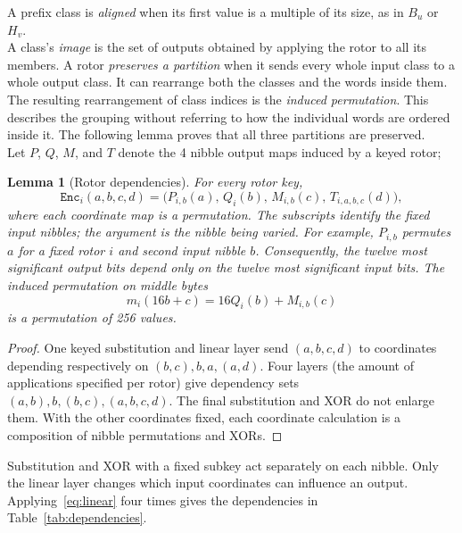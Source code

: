 \documentclass[11pt]{article}
\newtheorem{lemma}[theorem]{Lemma}
\begin{document}
A prefix class is \emph{aligned}
when its first value is a multiple of its size, as in \(B_u\) or \(H_v\).\\

A class's \emph{image} is the set of outputs obtained by applying
the rotor to all its members. A rotor \emph{preserves a partition} when it sends every whole
input class to a whole output class. It can rearrange both the classes
and the words inside them. The resulting rearrangement of class
indices is the \emph{induced permutation}. This describes the grouping without referring to how the individual words are ordered inside it.
The following lemma proves that all
three partitions are preserved.\\

Let \(P\), \(Q\), \(M\), and \(T\) denote the 4 nibble output maps induced by a keyed rotor;

\begin{lemma}[Rotor dependencies]\label{lem:triangular}
For every rotor key,
\[
 \mathtt{Enc}_i(a,b,c,d)
 =\bigl(P_{i,b}(a),\,Q_i(b),\,M_{i,b}(c),\,
         T_{i,a,b,c}(d)\bigr),
\]
where each coordinate map is a permutation.
The subscripts identify the fixed input nibbles; the argument is the
nibble being varied. For example, \(P_{i,b}\) permutes \(a\) for a fixed
rotor \(i\) and second input nibble \(b\).
Consequently, the twelve most significant output bits depend only on
the twelve most significant input bits. The induced permutation on middle bytes
\[
 m_i(16b+c)=16Q_i(b)+M_{i,b}(c)
\]
is a permutation of 256 values.
\end{lemma}
\begin{proof}
One keyed substitution and linear layer send
\((a,b,c,d)\) to coordinates depending respectively on
\((b,c),b,a,(a,d)\). Four layers (the amount of applications specified per rotor) give dependency sets
\((a,b),b,(b,c),(a,b,c,d)\). The final substitution and XOR
do not enlarge them. With the other coordinates fixed, each
coordinate calculation is a composition of nibble permutations and XORs.
\end{proof}

Substitution and XOR with a fixed subkey act separately on each nibble.
Only the linear layer changes which input coordinates can influence
an output. Applying~\eqref{eq:linear} four times gives the dependencies
in Table~\ref{tab:dependencies}.
\end{document}
